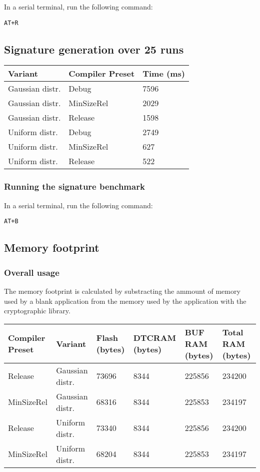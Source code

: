 \documentclass[
]{article}
\begin{document}
In a serial terminal, run the following command:

\texttt{AT+R}

\hypertarget{signature-generation-over-25-runs}{%
\subsection{Signature generation over 25
runs}\label{signature-generation-over-25-runs}}

\begin{longtable}[]{@{}lll@{}}
\toprule
Variant & Compiler Preset & Time (ms)\tabularnewline
\midrule
\endhead
Gaussian distr. & Debug & 7596\tabularnewline
Gaussian distr. & MinSizeRel & 2029\tabularnewline
Gaussian distr. & Release & 1598\tabularnewline
Uniform distr. & Debug & 2749\tabularnewline
Uniform distr. & MinSizeRel & 627\tabularnewline
Uniform distr. & Release & 522\tabularnewline
\bottomrule
\end{longtable}

\hypertarget{running-the-signature-benchmark}{%
\subsubsection{Running the signature
benchmark}\label{running-the-signature-benchmark}}

In a serial terminal, run the following command:

\texttt{AT+B}

\hypertarget{memory-footprint}{%
\subsection{Memory footprint}\label{memory-footprint}}

\hypertarget{overall-usage}{%
\subsubsection{Overall usage}\label{overall-usage}}

The memory footprint is calculated by substracting the ammount of memory
used by a blank application from the memory used by the application with
the cryptographic library.

\begin{longtable}[]{@{}llllll@{}}
\toprule
Compiler Preset & Variant & Flash (bytes) & DTCRAM (bytes) & BUF RAM
(bytes) & Total RAM (bytes)\tabularnewline
\midrule
\endhead
Release & Gaussian distr. & 73696 & 8344 & 225856 &
234200\tabularnewline
MinSizeRel & Gaussian distr. & 68316 & 8344 & 225853 &
234197\tabularnewline
Release & Uniform distr. & 73340 & 8344 & 225856 & 234200\tabularnewline
MinSizeRel & Uniform distr. & 68204 & 8344 & 225853 &
234197\tabularnewline
\bottomrule
\end{longtable}
\end{document}
